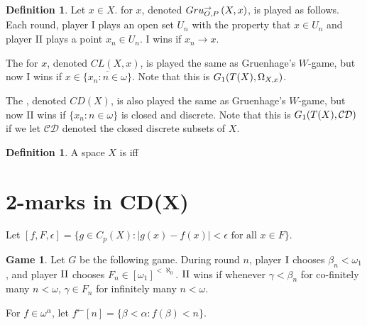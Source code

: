 \documentclass[11pt]{article}
\theoremstyle{plain}
\theoremstyle{definition}
\newtheorem{definition}[theorem]{Definition}
\newtheorem{game}[theorem]{Game}
\theoremstyle{remark}
\theoremstyle{plain}
\theoremstyle{definition}
\theoremstyle{remark}
\begin{document}
\begin{definition}
Let \(x \in X\).
 for \(x\), denoted \(Gru_{O,P}^{\to}\left({X},{x}\right)\), is played as follows.
Each round, player I plays an open set \(U_n\) with the property that \(x \in U_n\) and player II plays a point \(x_n \in U_n\).
I wins if \(x_n \to x\).

The  for \(x\), denoted \(CL(X,x)\), is played the same as Gruenhage's \(W\)-game, but now I wins if \(x \in \overline{\{x_n : n \in \omega\}}\).
Note that this is \(G_{1}(T(X),\Omega_{X,x})\).

The , denoted \(CD(X)\), is also played the same as Gruenhage's \(W\)-game, but now II wins if \(\{x_n : n \in \omega\}\) is closed and discrete.
Note that this is \(G_{1}(T(X),\mathcal{CD})\) if we let \(\mathcal{CD}\) denoted the closed discrete subsets of \(X\).
\end{definition}

\begin{definition}
A space \(X\) is  iff 
\end{definition}

\section{2-marks in CD(X)}

Let 
\(
  [f,F,\epsilon]
    =
  \{g\in C_p(X):|g(x)-f(x)|<\epsilon\text{ for all }x\in F\}
\).

\begin{game}
  Let \(G\) be the following game. During round \(n\), player \(\mathrm{I}\)
  chooses \(\beta_n<\omega_1\), and player \(\mathrm{II}\) chooses
  \(F_n\in[\omega_1]^{<\aleph_0}\). \(\mathrm{II}\) wins if
  whenever \(\gamma<\beta_n\) for co-finitely many \(n<\omega\),
  \(\gamma\in F_n\) for infinitely many \(n<\omega\).
\end{game}

For \(f\in\omega^\alpha\), let 
\(f^{\leftarrow}[n]=\{\beta<\alpha:f(\beta)<n\}\).
\end{document}
